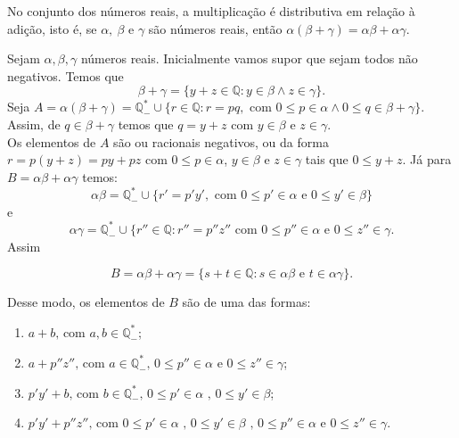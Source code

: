 \documentclass[../main.tex]{subfiles}
\begin{document}
\begin{prop}\label{reais-prop-produtoDistributivo}
    No conjunto dos números reais, a multiplicação é distributiva em relação à adição, isto é, se $\alpha,\ \beta$ e $\gamma$ são números reais, então 
    $\alpha(\beta + \gamma) = \alpha\beta+\alpha\gamma$.
\end{prop}
\begin{dem}
    Sejam $\alpha, \beta, \gamma$ números reais. Inicialmente vamos supor que sejam todos não negativos. Temos que 
    \[ \beta + \gamma = \{ y+z \in \mathbb{Q} : y \in \beta \land z \in \gamma \} .\]
    Seja $A = \alpha(\beta+\gamma) = \mathbb{Q}^*_{-} \cup \{ r \in \mathbb{Q} : r = pq, \text{ com } 0 \leq p \in \alpha \land 0 \leq q \in \beta + \gamma \}$. \\
    Assim, de $q \in \beta + \gamma$ temos que $q = y + z$ com $y \in \beta$ e $z \in \gamma$. \\
    Os elementos de $A$ são ou racionais negativos, ou da forma $r = p(y+z) = py + pz$ com $0 \leq p \in \alpha$, $y \in \beta$ e $z \in \gamma$ tais que $0 \leq y + z$. 
    Já para $B = \alpha\beta + \alpha\gamma$ temos: 
    \[ \alpha\beta = \mathbb{Q}^*_{-} \cup \{ r'= p'y', \text{ com } 0 \leq p' \in \alpha \text{ e } 0 \leq y' \in \beta \} \]
    e
    \[ \alpha \gamma = \mathbb{Q}^*_{-} \cup \{ r'' \in \mathbb{Q} : r'' = p''z'' \text{ com } 0 \leq p'' \in \alpha \text{ e } 0 \leq z'' \in \gamma .\]
    Assim
    
    \[ B = \alpha \beta + \alpha \gamma = \{ s+t \in \mathbb{Q} : s \in \alpha \beta \text{ e } t \in \alpha \gamma \} . \]

    Desse modo, os elementos de $B$ são de uma das formas:
    \begin{enumerate}[label=(\roman*), ref={forma~(\roman*)}]\label{reais-dummy-charBFormas}
        \item\label{reais-dummy-charBa} $a + b \text{, com } a, b \in \mathbb{Q}^*_{-}$; 
        \item\label{reais-dummy-charBb} $a + p''z''\text{, com }a \in \mathbb{Q}^*_{-} \text{, } 0 \leq p'' \in \alpha \text{ e }0 \leq z'' \in \gamma$; 
        \item\label{reais-dummy-charBc} $p'y' + b\text{, com }b \in \mathbb{Q}^*_{-} \text{, } 0 \leq p' \in \alpha \text{ , } 0 \leq y' \in \beta$; 
        \item\label{reais-dummy-charBd} $p'y' + p''z''\text{, com }0 \leq p' \in  \alpha \text{ , } 0 \leq y' \in \beta \text{ , } 0 \leq p'' \in \alpha\text{ e }0 \leq z'' \in \gamma$.
    \end{enumerate}


\end{dem}
\end{document}
